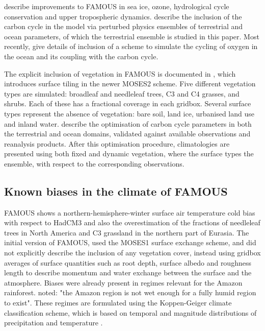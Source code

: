 \documentclass[esd, manuscript]{copernicus}
\begin{document}
\citep{smith2012famous} describe improvements to FAMOUS in sea ice, ozone, hydrological cycle conservation and upper tropospheric dynamics. \citep{williams2013optimising} describe the inclusion of the carbon cycle in the model via perturbed physics ensembles of terrestrial and ocean parameters, of which the terrestrial ensemble is studied in this paper. Most recently, \citep{williams2014oxygen} give details of inclusion of a scheme to simulate the cycling of oxygen in the ocean and its coupling with the carbon cycle.

The explicit inclusion of vegetation in FAMOUS is documented in \citep{williams2013optimising}, which introduces surface tiling in the newer MOSES2 scheme. Five different vegetation types are simulated: broadleaf and needleleaf trees, C3 and C4 grasses, and shrubs. Each of these has a fractional coverage in each gridbox. Several surface types represent the absence of vegetation: bare soil, land ice, urbanised land use and inland water. \citep{williams2013optimising} describe the optimisation of carbon cycle parameters in both the terrestrial and ocean domains, validated against available observations and reanalysis products. After this optimisation procedure, climatologies are presented using both fixed and dynamic vegetation, where the surface types the ensemble, with respect to the corresponding observations.  

\subsection{Known biases in the climate of FAMOUS}\label{ssec:biases}

FAMOUS shows a northern-hemisphere-winter surface air temperature cold bias with respect to HadCM3 and also the overestimation of the fractions of needleleaf trees in North America and C3 grassland in the northern part of Eurasia. The initial version of FAMOUS, used the MOSES1 surface exchange scheme, and did not explicitly describe the inclusion of any vegetation cover, instead using gridbox averages of surface quantities such as root depth, surface albedo and roughness length to describe momentum and water exchange between the surface and the atmosphere. Biases were already present in regimes relevant for the Amazon rainforest. \citep{smith2008famous} noted: "the Amazon region is not wet enough for a fully humid region to exist". These regimes are formulated using the Koppen-Geiger climate classification scheme, which is based on temporal and magnitude distributions of precipitation and temperature \citep{gnanadesikan2006diagnosing}.
\end{document}
